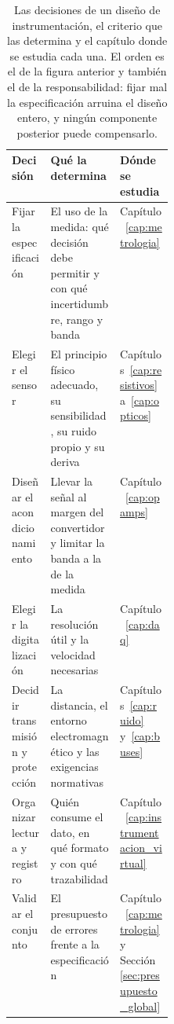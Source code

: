 \begin{table}[ht]
    \centering
    \small
    \setlength{\tabcolsep}{3pt}
    \forceversofloat %
    \begin{tabularx}{\linewidth}{@{} L{0.24\linewidth} >{\centering\arraybackslash}X >{\centering\arraybackslash}X @{}}
        \toprule
        \textbf{Decisión} & \textbf{Qué la determina} & \textbf{Dónde se estudia} \\
        \midrule
        Fijar la especificación & El uso de la medida: qué decisión debe permitir y con qué incertidumbre, rango y banda & Capítulo~\ref{cap:metrologia} \\
        Elegir el sensor & El principio físico adecuado, su sensibilidad, su ruido propio y su deriva & Capítulos~\ref{cap:resistivos} a~\ref{cap:opticos} \\
        Diseñar el acondicionamiento & Llevar la señal al margen del convertidor y limitar la banda a la de la medida & Capítulo~\ref{cap:opamps} \\
        Elegir la digitalización & La resolución útil y la velocidad necesarias & Capítulo~\ref{cap:daq} \\
        Decidir transmisión y protección & La distancia, el entorno electromagnético y las exigencias normativas & Capítulos~\ref{cap:ruido} y~\ref{cap:buses} \\
        Organizar lectura y registro & Quién consume el dato, en qué formato y con qué trazabilidad & Capítulo~\ref{cap:instrumentacion_virtual} \\
        Validar el conjunto & El presupuesto de errores frente a la especificación & Capítulo~\ref{cap:metrologia} y Sección~\ref{sec:presupuesto_global} \\
        \bottomrule
    \end{tabularx}
    \caption[Decisiones de diseño y el criterio que las determina.]{Las decisiones de un diseño de instrumentación, el criterio que las determina y el capítulo donde se estudia cada una. El orden es el de la figura anterior y también el de la responsabilidad: fijar mal la especificación arruina el diseño entero, y ningún componente posterior puede compensarlo.\protect\label{tab:decisiones_diseno}}
\end{table}

